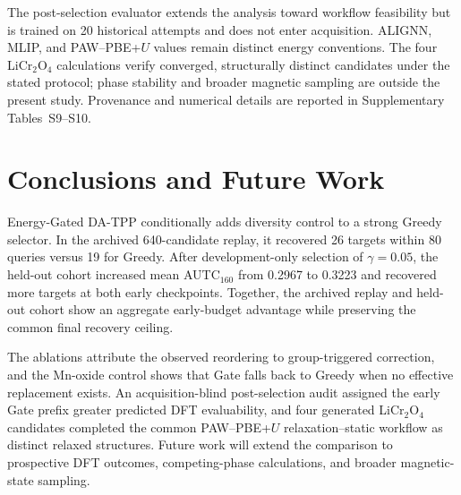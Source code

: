 The post-selection evaluator extends the analysis toward workflow feasibility
but is trained on 20 historical attempts and does not enter acquisition. ALIGNN,
MLIP, and PAW--PBE+$U$ values remain distinct energy conventions. The four
LiCr$_2$O$_4$ calculations verify converged, structurally distinct candidates
under the stated protocol; phase stability and broader magnetic sampling are
outside the present study. Provenance and numerical details are reported in
Supplementary Tables~S9--S10.

\section{Conclusions and Future Work}

Energy-Gated DA-TPP conditionally adds diversity control to a strong Greedy
selector. In the archived 640-candidate replay, it recovered 26 targets within
80 queries versus 19 for Greedy. After development-only selection of
$\gamma=0.05$, the held-out cohort increased mean AUTC$_{160}$ from
0.2967 to 0.3223 and recovered more targets at both early checkpoints. Together,
the archived replay and held-out cohort show an aggregate early-budget
advantage while preserving the common final recovery ceiling.

The ablations attribute the observed reordering to group-triggered correction,
and the Mn-oxide control shows that Gate falls back to Greedy when no effective
replacement exists. An acquisition-blind post-selection audit assigned the
early Gate prefix greater predicted DFT evaluability, and four generated
LiCr$_2$O$_4$ candidates completed
the common PAW--PBE+$U$ relaxation--static workflow as distinct relaxed
structures. Future work will extend the comparison to prospective DFT outcomes,
competing-phase calculations, and broader magnetic-state sampling.
